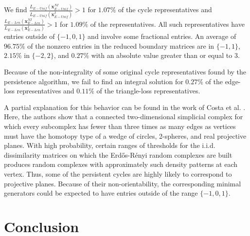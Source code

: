 \documentclass[11pt,onecolumn]{article}
\newcommand{\optimalrep}{\mathbf{x}}
\theoremstyle{plain}
\theoremstyle{definition}
\begin{document}
We find $\frac{L_{E-Unif}(\optimalrep^{NI}_{E-Unif})}{L_{E-Unif}(\optimalrep^{I}_{E-Unif})}> 1$ for $1.07\%$ of the cycle representatives and $\frac{L_{E-Len}(\optimalrep^{NI}_{E-Len})}{L_{E-Len}(\optimalrep^{I}_{E-Len})}> 1$ for $1.09\%$ of the representatives. All such representatives have entries outside of $\{-1,0,1\}$ and involve some fractional entries. An average of $96.75\%$ of the nonzero entries in the reduced boundary matrices are in $\{-1,1\}$, $2.15\%$ in $\{-2,2\}$, and $0.27\%$ with an absolute value greater than or equal to $3$. 

Because of the non-integrality of some original cycle representatives found by the persistence algorithm, we fail to find an integral solution for $0.27\%$ of the edge-loss representatives and $0.11\%$ of the triangle-loss representatives. 

A partial explanation for this  behavior can be found in the work of Costa et al. \cite{erdos-renyi-RP2}. Here, the authors show that a connected two-dimensional simplicial complex for which every subcomplex has fewer than three times as many edges as vertices must have the homotopy type of a wedge of circles, 2-spheres, and real projective planes. With high probability, certain ranges of thresholds for the i.i.d. dissimilarity matrices on which the Erd\H{o}s-R\'enyi random complexes are built produces random complexes with approximately such density patterns at each vertex. Thus, some of the persistent cycles are highly likely to correspond to projective planes. Because of their non-orientability, the corresponding minimal generators could be expected to have entries outside of the range $\{-1, 0, 1\}.$

 \section{Conclusion}\label{discussion}
\end{document}

